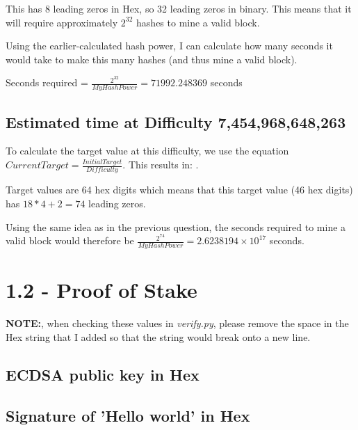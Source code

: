 \documentclass[11pt]{article}
\begin{document}
	This has 8 leading zeros in Hex, so 32 leading zeros in binary. This means that it will require approximately $2^{32}$ hashes to mine a valid block. \newline
	
	Using the earlier-calculated hash power, I can calculate how many seconds it would take to make this many hashes (and thus mine a valid block). \newline
	
	Seconds required = $\frac{2^{32}}{My Hash Power} = 71992.248369$ seconds \newpage
	
	\subsection*{Estimated time at Difficulty 7,454,968,648,263}
	To calculate the target value at this difficulty, we use the equation $Current Target = \frac{Initial Target}{Difficulty}$. This results in: . \newline
	
	Target values are 64 hex digits which means that this target value (46 hex digits) has $18*4+2=74$ leading zeros. \newline
	
	Using the same idea as in the previous question, the seconds required to mine a valid block would therefore be $\frac{2^{74}}{My Hash Power} = 2.6238194 \times 10^{17}$ seconds.
	
	
	\newpage
	
	
	\section*{1.2 - Proof of Stake}
	\textbf{NOTE:}, when checking these values in \textit{verify.py}, please remove the space in the Hex string that I added so that the string would break onto a new line.
	
	\subsection*{ECDSA public key in Hex}
	
	\subsection*{Signature of 'Hello world' in Hex}
	
\end{document}
